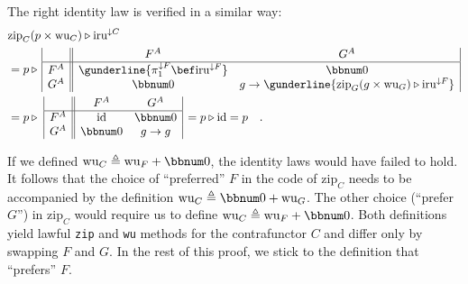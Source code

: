 The right identity law is verified in a similar way:
\begin{align*}
 & \text{zip}_{C}(p\times\text{wu}_{C})\triangleright\text{iru}^{\downarrow C}\\
 & =p\triangleright\,\begin{array}{|c||cc|}
 & F^{A} & G^{A}\\
\hline F^{A} & \gunderline{\pi_{1}^{\downarrow F}\bef\text{iru}^{\downarrow F}} & \bbnum 0\\
G^{A} & \bbnum 0 & g\rightarrow\gunderline{\text{zip}_{G}(g\times\text{wu}_{G})\triangleright\text{iru}^{\downarrow F}}
\end{array}\\
 & =p\triangleright\,\,\begin{array}{|c||cc|}
 & F^{A} & G^{A}\\
\hline F^{A} & \text{id} & \bbnum 0\\
G^{A} & \bbnum 0 & g\rightarrow g
\end{array}\,=p\triangleright\text{id}=p\quad.
\end{align*}

If we defined $\text{wu}_{C}\triangleq\text{wu}_{F}+\bbnum 0$, the
identity laws would have failed to hold. It follows that the choice
of \textsf{``}preferred\textsf{''} $F$ in the code of $\text{zip}_{C}$ needs to
be accompanied by the definition $\text{wu}_{C}\triangleq\bbnum 0+\text{wu}_{G}$.
The other choice (\textsf{``}prefer $G$\textsf{''}) in $\text{zip}_{C}$ would require
us to define $\text{wu}_{C}\triangleq\text{wu}_{F}+\bbnum 0$. Both
definitions yield lawful \lstinline!zip! and \lstinline!wu! methods
for the contrafunctor $C$ and differ only by swapping $F$ and $G$.
In the rest of this proof, we stick to the definition that \textsf{``}prefers\textsf{''}
$F$.

